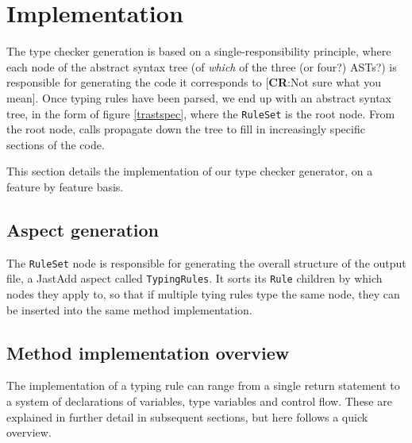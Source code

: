 \documentclass[nofilelist]{cslthse-msc}
\newcommand{\CR}[1]{\textcolor{green!60!black}{[\textbf{CR}:#1]}}
\begin{document}
\section{Implementation}\label{typingrulecompiler} %

The type checker generation is based on a single-responsibility principle, where each node of the abstract syntax tree (of \emph{which} of the three (or four?) ASTs?) is responsible for generating the code it corresponds to \CR{Not sure what you mean}.
Once typing rules have been parsed, we end up with an abstract syntax tree, in the form of figure \ref{trastspec}, where the \verb|RuleSet| is the root node.
From the root node, calls propagate down the tree to fill in increasingly specific sections of the code.

This section details the implementation of our type checker generator, on a feature by feature basis.


\subsection{Aspect generation}
The \verb|RuleSet| node is responsible for generating the overall structure of the output file, a JastAdd aspect called \verb|TypingRules|.
It sorts its \verb|Rule| children by which nodes they apply to, so that if multiple tying rules type the same node, they can be inserted into the same method implementation.

\subsection{Method implementation overview}
The implementation of a typing rule can range from a single return statement to a system of declarations of variables, type variables and control flow.
These are explained in further detail in subsequent sections, but here follows a quick overview.
\end{document}
